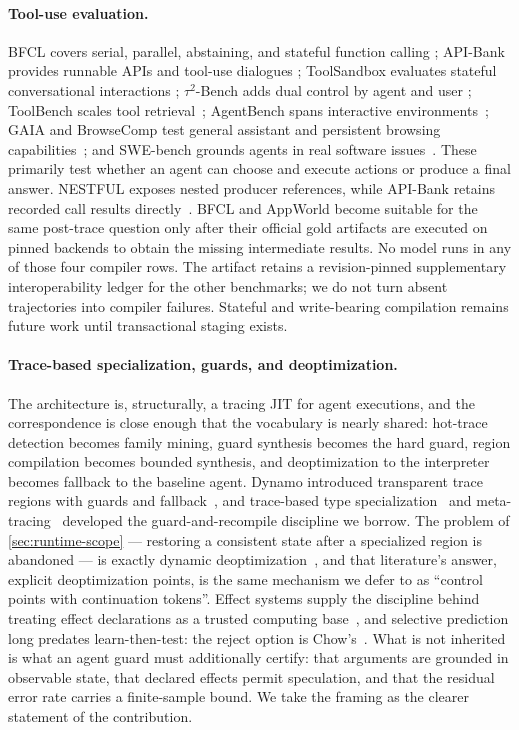 \paragraph{Tool-use evaluation.}
BFCL covers serial, parallel, abstaining, and stateful function calling
\cite{patil2025bfcl}; API-Bank provides runnable APIs and tool-use dialogues
\cite{li2023apibank}; ToolSandbox evaluates stateful conversational interactions
\cite{lu2025toolsandbox}; $\tau^2$-Bench adds dual control by agent and user
\cite{barres2025tau2}; ToolBench scales tool retrieval~\cite{qin2023toolllm}; AgentBench
spans interactive environments~\cite{liu2023agentbench}; GAIA and BrowseComp test general
assistant and persistent browsing capabilities~\cite{mialon2023gaia,wei2025browsecomp};
and SWE-bench grounds agents in real software issues~\cite{jimenez2024swebench}.  These
primarily test whether an agent can choose and execute actions or produce a final answer.
NESTFUL exposes nested producer references, while API-Bank retains recorded call results
directly~\cite{basu2025nestful}. BFCL and AppWorld become suitable for the same post-trace
question only after their official gold artifacts are executed on pinned backends to obtain
the missing intermediate results. No model runs in any of those four compiler rows. The artifact
retains a revision-pinned supplementary interoperability ledger for the other benchmarks;
we do not turn absent trajectories into compiler failures. Stateful and write-bearing
compilation remains future work until transactional staging exists.

\paragraph{Trace-based specialization, guards, and deoptimization.}
The architecture is, structurally, a tracing JIT for agent executions, and the correspondence
is close enough that the vocabulary is nearly shared: hot-trace detection becomes family
mining, guard synthesis becomes the hard guard, region compilation becomes bounded synthesis,
and deoptimization to the interpreter becomes fallback to the baseline agent.  Dynamo
introduced transparent trace regions with guards and fallback~\cite{bala2000dynamo}, and
trace-based type specialization~\cite{gal2009tracejit} and meta-tracing~\cite{bolz2009pypy}
developed the guard-and-recompile discipline we borrow.  The problem of
\cref{sec:runtime-scope} --- restoring a consistent state after a specialized region is
abandoned --- is exactly dynamic deoptimization~\cite{holzle1992deopt}, and that literature's
answer, explicit deoptimization points, is the same mechanism we defer to as ``control points
with continuation tokens''.  Effect systems supply the discipline behind treating effect
declarations as a trusted computing base~\cite{lucassen1988effects}, and selective prediction
long predates learn-then-test: the reject option is Chow's~\cite{chow1970reject}.  What is not
inherited is what an agent guard must additionally certify: that arguments are grounded in
observable state, that declared effects permit speculation, and that the residual error rate
carries a finite-sample bound.  We take the framing as the clearer statement of the
contribution.

